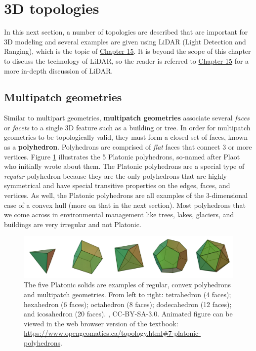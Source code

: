 \documentclass[
]{book}
\begin{document}
\section{3D topologies}\label{d-topologies}

In this next section, a number of topologies are described that are important for 3D modeling and several examples are given using LiDAR (Light Detection and Ranging), which is the topic of \href{https://ubc-geomatics-textbook.github.io/geomatics-textbook/LiDAR-acquisition-and-analysis.html}{Chapter 15}. It is beyond the scope of this chapter to discuss the technology of LiDAR, so the reader is referred to \href{https://ubc-geomatics-textbook.github.io/geomatics-textbook/LiDAR-acquisition-and-analysis.html}{Chapter 15} for a more in-depth discussion of LiDAR.

\subsection{Multipatch geometries}\label{multipatch-geometries}

Similar to multipart geometries, \textbf{multipatch geometries} associate several \emph{faces} or \emph{facets} to a single 3D feature such as a building or tree. In order for multipatch geometries to be topologically valid, they must form a closed set of faces, known as a \textbf{polyhedron}. Polyhedrons are comprised of \emph{flat} faces that connect 3 or more vertices. Figure \ref{fig:7-platonic-polyhedrons} illustrates the 5 Platonic polyhedrons, so-named after Plaot who initially wrote about them. The Platonic polyhedrons are a special type of \emph{regular} polyhedron because they are the only polyhedrons that are highly symmetrical and have special transitive properties on the edges, faces, and vertices. As well, the Platonic polyhedrons are all examples of the 3-dimensional case of a convex hull (more on that in the next section). Most polyhedrons that we come across in environmental management like trees, lakes, glaciers, and buildings are very irregular and not Platonic.



\begin{figure}
\includegraphics[width=0.75\linewidth]{images/07-platonic-polyhedrons-static} \caption{The five Platonic solids are examples of regular, convex polyhedrons and multipatch geometries. From left to right: tetrahedron (4 faces); hexahedron (6 faces); octahedron (8 faces); dodecahedron (12 faces); and icosahedron (20 faces). \citep{cyp_polyhedra_2005}, CC-BY-SA-3.0. Animated figure can be viewed in the web browser version of the textbook: \url{https://www.opengeomatics.ca/topology.html\#7-platonic-polyhedrons}.}\label{fig:7-platonic-polyhedrons}
\end{figure}
\end{document}
